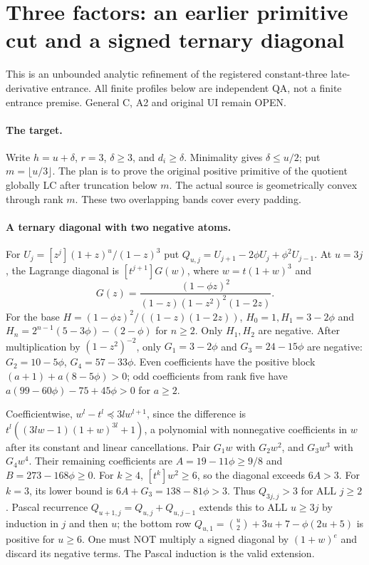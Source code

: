 \section{Three factors: an earlier primitive cut and a signed ternary diagonal}
This is an unbounded analytic refinement of the registered constant-three
late-derivative entrance. All finite profiles below are independent QA,
not a finite entrance premise. General C, A2 and original UI remain OPEN.

\paragraph{The target.}
Write $h=u+\delta$, $r=3$, $\delta\ge3$, and $d_i\ge\delta$.
Minimality gives $\delta\le u/2$; put $m=\lfloor u/3\rfloor$.
The plan is to prove the original positive primitive of the quotient
globally LC after truncation below $m$. The actual source is geometrically
convex through rank $m$. These two overlapping bands cover every padding.

\paragraph{A ternary diagonal with two negative atoms.}
For $U_j=[z^j](1+z)^u/(1-z)^3$ put
$Q_{u,j}=U_{j+1}-2\phi U_j+\phi^2U_{j-1}$.
At $u=3j$, the Lagrange diagonal is $[t^{j+1}]G(w)$, where
$w=t(1+w)^3$ and
\[
 G(z)=\frac{(1-\phi z)^2}{(1-z)(1-z^2)^2(1-2z)}.
\]
For the base $H=(1-\phi z)^2/((1-z)(1-2z))$,
$H_0=1,H_1=3-2\phi$ and
$H_n=2^{n-1}(5-3\phi)-(2-\phi)$ for $n\ge2$.
Only $H_1,H_2$ are negative. After multiplication by $(1-z^2)^{-2}$,
only $G_1=3-2\phi$ and $G_3=24-15\phi$ are negative:
$G_2=10-5\phi$, $G_4=57-33\phi$.
Even coefficients have the positive block
$(a+1)+a(8-5\phi)>0$; odd coefficients from rank five have
$a(99-60\phi)-75+45\phi>0$ for $a\ge2$.

Coefficientwise, $w^l-t^l\preceq3l w^{l+1}$, since the difference
is $t^l((3lw-1)(1+w)^{3l}+1)$, a polynomial with nonnegative
coefficients in $w$ after its constant and linear cancellations.
Pair $G_1w$ with $G_2w^2$, and $G_3w^3$ with $G_4w^4$.
Their remaining coefficients are
$A=19-11\phi\ge9/8$ and $B=273-168\phi\ge0$.
For $k\ge4$, $[t^k]w^2\ge6$, so the diagonal exceeds $6A>3$.
For $k=3$, its lower bound is $6A+G_3=138-81\phi>3$.
Thus $Q_{3j,j}>3$ for ALL $j\ge2$.
Pascal recurrence $Q_{u+1,j}=Q_{u,j}+Q_{u,j-1}$ extends this to
ALL $u\ge3j$ by induction in $j$ and then $u$; the bottom row
$Q_{u,1}=\binom u2+3u+7-\phi(2u+5)$ is positive for $u\ge6$.
One must NOT multiply a signed diagonal by $(1+w)^e$ and discard
its negative terms. The Pascal induction is the valid extension.


